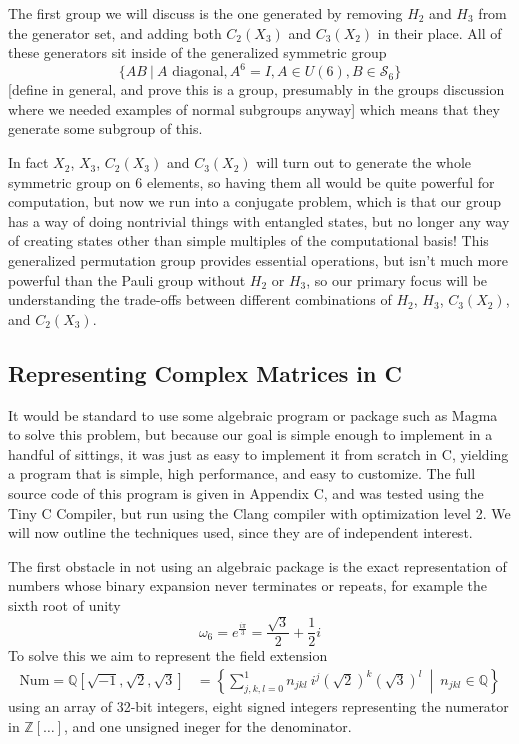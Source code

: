 The first group we will discuss is the one generated by removing $H_2$ and $H_3$ from the generator set, and adding both $C_2(X_3)$ and $C_3(X_2)$ in their place. All of these generators sit inside of the generalized symmetric group
\[\{AB\ |\ A\text{\ diagonal}, A^6 = I, A \in U(6), B \in \mathcal{S}_6\}\]
[define in general, and prove this is a group, presumably in the groups discussion where we needed examples of normal subgroups anyway]
which means that they generate some subgroup of this.

In fact $X_2$, $X_3$, $C_2(X_3)$ and $C_3(X_2)$ will turn out to generate the whole symmetric group on 6 elements, so having them all would be quite powerful for computation, but now we run into a conjugate problem, which is that our group has a way of doing nontrivial things with entangled states, but no longer any way of creating states other than simple multiples of the computational basis! This generalized permutation group provides essential operations, but isn't much more powerful than the Pauli group without $H_2$ or $H_3$, so our primary focus will be understanding the trade-offs between different combinations of $H_2$, $H_3$, $C_3(X_2)$, and $C_2(X_3)$.
\subsection{Representing Complex Matrices in C}
It would be standard to use some algebraic program or package such as Magma to solve this problem, but because our goal is simple enough to implement in a handful of sittings, it was just as easy to implement it from scratch in C, yielding a program that is simple, high performance, and easy to customize. The full source code of this program is given in Appendix C, and was tested using the Tiny C Compiler, but run using the Clang compiler with optimization level 2. We will now outline the techniques used, since they are of independent interest. 

The first obstacle in not using an algebraic package is the exact representation of numbers whose binary expansion never terminates or repeats, for example the sixth root of unity
\[\omega_6 = e^{\frac{i\pi}{3}} = \frac{\sqrt{3}}{2} + \frac{1}{2}i\]
To solve this we aim to represent the field extension
\begin{align*}
	\text{Num} = \mathbb{Q}[\sqrt{-1}, \sqrt{2}, \sqrt{3}]
	&= \left\{ \sum_{j,k,l = 0}^1 n_{jkl}\ i^j\left(\sqrt{2}\right)^k\left(\sqrt{3}\right)^l
	\ \middle|\ n_{jkl} \in \mathbb{Q}\right\}
\end{align*}
using an array of 32-bit integers, eight signed integers representing the numerator in $\mathbb{Z}[\dots]$, and one unsigned ineger for the denominator.


